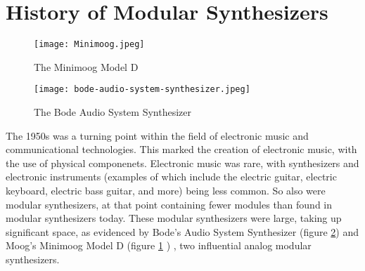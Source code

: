 \section[History of Modular Synthesizers]{History of Modular Synthesizers}\label{section:mod-synth-history}

\begin{figure}
  \centering
  \texttt{[image: Minimoog.jpeg]}
  \caption{The Minimoog Model D}
  \label{fig:minimoog}
\end{figure}

\begin{figure}
  \centering
  \texttt{[image: bode-audio-system-synthesizer.jpeg]}
  \caption{The Bode Audio System Synthesizer}
  \label{fig:bode-audio-system-synthesizer}
\end{figure}


The 1950s was a turning point within the field of electronic music and communicational technologies. This marked the creation of electronic music, with the use of physical componenets. Electronic music was rare, with synthesizers and electronic instruments (examples of which include the electric guitar, electric keyboard, electric bass guitar, and more) being less common. So also were modular synthesizers, at that point containing fewer modules than found in modular synthesizers today. These modular synthesizers were large, taking up significant space, as evidenced by Bode's Audio System Synthesizer (figure \ref{fig:bode-audio-system-synthesizer}) \cite{Crab_2019a} \cite{Says_2014} and Moog's Minimoog Model D (figure \ref{fig:minimoog} \cite{Krash_2005}) \cite{Pinch_Trocco_1998} \cite{Pinch_Trocco_2004}, two influential analog modular synthesizers.

